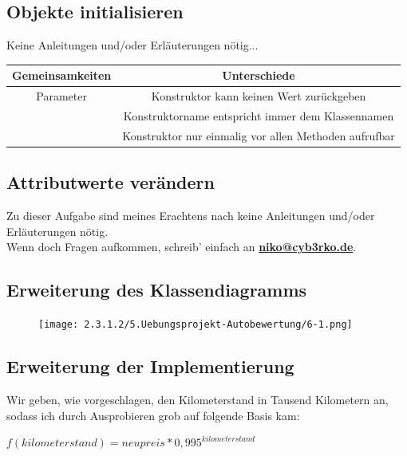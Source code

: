 \documentclass{scrartcl}   %
\begin{document}
\subsection{Objekte initialisieren}

\begin{itemize}
    \barrow Keine Anleitungen und/oder Erläuterungen nötig...
    \barrow \vspace{15pt}
    \begin{tabular}[ht]{c|c}
\\\textbf{Gemeinsamkeiten} & \textbf{Unterschiede}\\
\hline
Parameter & Konstruktor kann keinen Wert zurückgeben\\
\hline
& Konstruktorname entspricht immer dem Klassennamen\\
\hline
& Konstruktor nur einmalig vor allen Methoden aufrufbar\\
\end{tabular}
\end{itemize}

\subsection{Attributwerte verändern}

Zu dieser Aufgabe sind meines Erachtens nach keine Anleitungen und/oder Erläuterungen nötig.\\
Wenn doch Fragen aufkommen, schreib' einfach an \textbf{\href{mailto:niko@cyb3rko.de}{niko@cyb3rko.de}}.

\subsection{Erweiterung des Klassendiagramms}
\label{klassendiagramm}

\begin{figure}[ht]
	\centering
	\texttt{[image: 2.3.1.2/5.Uebungsprojekt-Autobewertung/6-1.png]}
\end{figure}

\subsection{Erweiterung der Implementierung}

Wir geben, wie vorgeschlagen, den Kilometerstand in \glqq Tausend Kilometern\grqq{} an, sodass ich durch Ausprobieren grob auf folgende Basis kam:

\begin{center}
    \texttt{$f(kilometerstand) = neupreis * 0,995^{kilometerstand}$}
\end{center}
\end{document}
